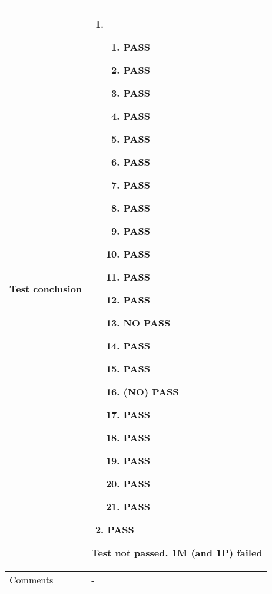 \begin{center}
\begin{longtable}{ | p{4cm} | p{10cm} | }
			Test conclusion & 	\begin{enumerate}
							\item
							\begin{enumerate}
								\item PASS
								\item PASS
								\item PASS
								\item PASS
								\item PASS
								\item PASS								
								\item PASS
								\item PASS
								\item PASS
								\item PASS
								\item PASS								
								\item PASS
								\item NO PASS
								\item PASS
								\item PASS
								\item (NO) PASS
								\item PASS
								\item PASS
								\item PASS
								\item PASS
								\item PASS
							\end{enumerate}
							\item PASS
						\end{enumerate}
						Test not passed. 1M (and 1P) failed \\ [3pt] \hline

			Comments & -
					\\ [3pt] \hline
\end{longtable}
\end{center}

